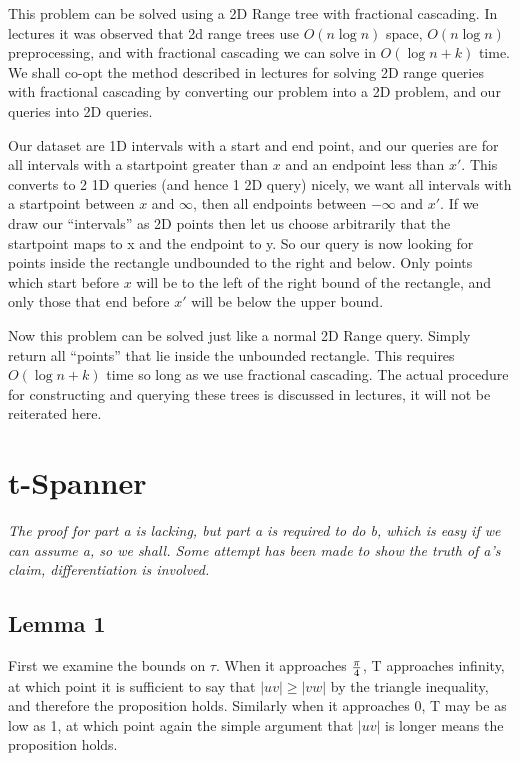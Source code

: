\documentclass{article}
\begin{document}
This problem can be solved using a 2D Range tree with fractional cascading.
In lectures it was observed that 2d range trees use $O(n \log n)$ space, $O(n \log n)$ preprocessing, and with fractional cascading we can solve in $O(\log n + k)$ time.
We shall co-opt the method described in lectures for solving 2D range queries with fractional cascading by converting our problem into a 2D problem, and our queries into 2D queries.

Our dataset are 1D intervals with a start and end point, and our queries are for all intervals with a startpoint greater than $x$ and an endpoint less than $x'$.
This converts to 2 1D queries (and hence 1 2D query) nicely, we want all intervals with a startpoint between $x$ and $\infty$, then all endpoints between $-\infty$ and $x'$.
If we draw our ``intervals'' as 2D points then let us choose arbitrarily that the startpoint maps to x and the endpoint to y.
So our query is now looking for points inside the rectangle undbounded to the right and below.
Only points which start before $x$ will be to the left of the right bound of the rectangle, and only those that end before $x'$ will be below the upper bound.

Now this problem can be solved just like a normal 2D Range query.
Simply return all ``points'' that lie inside the unbounded rectangle.
This requires $O(\log n + k)$ time so long as we use fractional cascading.
The actual procedure for constructing and querying these trees is discussed in lectures, it will not be reiterated here.

\section {t-Spanner}

{\em The proof for part a is lacking, but part a is required to do b, which is easy if we can assume a, so we shall.  Some attempt has been made to show the truth of a's claim, differentiation is involved.}

\subsection*{Lemma 1}
First we examine the bounds on $\tau$.
When it approaches $\pi \over 4$, T approaches infinity, at which point it is sufficient to say that $|uv| \geq |vw|$ by the triangle inequality, and therefore the proposition holds.
Similarly when it approaches 0, T may be as low as 1, at which point again the simple argument that $|uv|$ is longer means the proposition holds.
\end{document}
